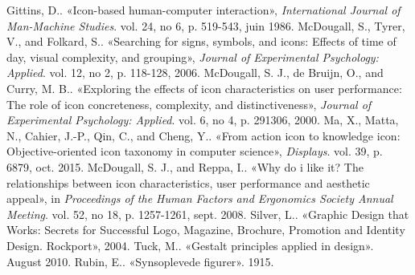 \documentclass[12pt,a4paper]{article}
\begin{document}
\begin{thebibliography}{20}
 Gittins, D.. «Icon-based human-computer interaction», \textit{International Journal of Man-Machine Studies}. vol. 24, no 6, p. 519-543, juin 1986.
 McDougall, S., Tyrer, V., and Folkard, S.. «Searching for signs, symbols, and icons: Effects of time of day, visual complexity, and grouping», \textit{Journal of Experimental Psychology: Applied}. vol. 12, no 2, p. 118-128, 2006.
 McDougall, S. J., de Bruijn, O., and Curry, M. B.. «Exploring the effects of icon characteristics on user performance: The role of icon concreteness, complexity, and distinctiveness», \textit{Journal of Experimental Psychology: Applied}. vol. 6, no 4, p. 291306, 2000.
 Ma, X., Matta, N., Cahier, J.-P., Qin, C., and Cheng, Y.. «From action icon to knowledge icon: Objective-oriented icon taxonomy in computer science», \textit{Displays}. vol. 39, p. 6879, oct.
2015.
 McDougall, S. J., and Reppa, I.. «Why do i like it? The relationships between icon characteristics, user performance and aesthetic appeal», in \textit{Proceedings of the Human Factors and Ergonomics Society Annual Meeting}. vol. 52, no 18, p. 1257-1261, sept. 2008.
 Silver, L.. «Graphic Design that Works: Secrets for Successful Logo, Magazine, Brochure, Promotion and Identity Design. Rockport», 2004.
 Tuck, M.. «Gestalt principles applied in design». August 2010.
 Rubin, E.. «Synsoplevede figurer». 1915.
\end{thebibliography}
\end{document}
